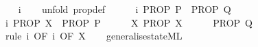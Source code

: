 \begin{isabellebody}
%
\isadelimproof
\ \ %
\endisadelimproof
%
\isatagproof
{}\isamarkupfalse%
\ i\isanewline
\ \ \isamarkupfalse%
\ {\isacharparenleft}unfold\ prop{\isacharunderscore}def{\isacharparenright}\isanewline
\ \ \ \ \isamarkupfalse%
\ i{}{\isacharcolon}\ {\isachardoublequoteopen}PROP\ P\ {\isasymLongrightarrow}\ PROP\ Q{\isachardoublequoteclose}\isanewline
\ \ \ \ \isamarkupfalse%
\ i{}{\isacharcolon}\ {\isachardoublequoteopen}PROP\ X\ {\isasymLongrightarrow}\ PROP\ P{\isachardoublequoteclose}\isanewline
\ \ \ \ \isamarkupfalse%
\ X{\isacharcolon}\ {\isachardoublequoteopen}PROP\ X{\isachardoublequoteclose}\isanewline
\ \ \ \ \isamarkupfalse%
\ {\isachardoublequoteopen}PROP\ Q{\isachardoublequoteclose}\isanewline
\ \ \ \ \ \ \isamarkupfalse%
\ {\isacharparenleft}rule\ i{}\ {\isacharbrackleft}OF\ i{}\ {\isacharbrackleft}OF\ X{\isacharbrackright}{\isacharbrackright}{\isacharparenright}\isanewline
\ \ \isamarkupfalse%
%
\endisatagproof
{\isafoldproof}%
%
\isadelimproof
\isanewline
%
\endisadelimproof
\isanewline
%
\isadelimML
\isanewline
%
\endisadelimML
%
\isatagML
{}\isamarkupfalse%
\ {\isachardoublequoteopen}generalise{\isacharunderscore}state{\isachardot}ML{\isachardoublequoteclose}%
\endisatagML
{\isafoldML}%
%
\isadelimML
\isanewline
%
\endisadelimML
%
\isadelimtheory
\isanewline
%
\endisadelimtheory
%
\isatagtheory
{}\isamarkupfalse%
%
\endisatagtheory
{\isafoldtheory}%
%
\isadelimtheory
%
\endisadelimtheory
%
\end{isabellebody}%
